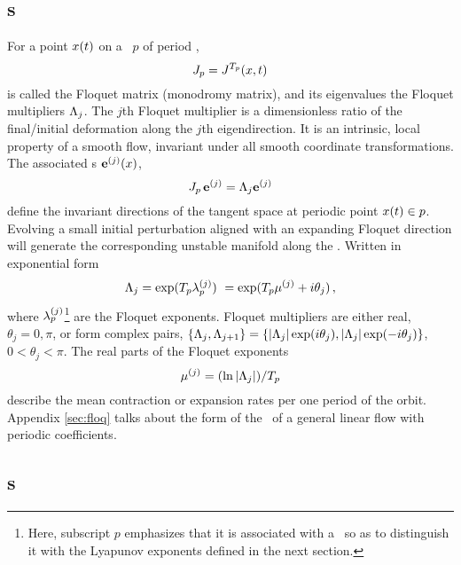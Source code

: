 \subsection{\Fv s}
\label{sect:LinStab}

For a point
$\ssp(\zeit)$ on a \po\ $p$ of period ,
\begin{equation}
  \label{eq:fm}
  \jMps_p=\jMps^{\period{p}}(\ssp, \zeit)
\end{equation}
is called the Floquet matrix
(monodromy matrix), and its
eigenvalues the Floquet multipliers $\ExpaEig_{j}$.
The $j$th Floquet multiplier is a dimensionless ratio of
the final/initial
deformation along the $j$th eigendirection. It is an intrinsic, local
property of a smooth flow, invariant under all smooth coordinate
transformations. The associated
\Fv s $\jEigvec[j](\ssp)$,
\begin{equation}
  \label{eq:fv}
  \jMps_p\,\jEigvec[j]=\ExpaEig_{j}\jEigvec[j]
\end{equation} define the invariant
directions of the tangent space at periodic point
$\ssp(\zeit)\in p$. Evolving a small initial perturbation aligned with
an expanding Floquet direction will generate the corresponding
unstable manifold along
the \po. Written in exponential form
\[
  \ExpaEig_{j} = \exp(\period{p}\Lyap^{(j)}_p)\
  = \exp(\period{p}\eigRe[j] + i\theta_j)
  \,,
\]
where $\Lyap^{(j)}_p$\footnote{Here, subscript $p$ emphasizes
  that it is
  associated with a \po\ so as to distinguish it
  with the Lyapunov exponents defined in
  the next section.} are the
Floquet exponents.
Floquet multipliers are either real,
$\theta_j = 0, \pi$, or form
complex pairs, $\{\ExpaEig_{j},\ExpaEig_{j+1}\} =
\{|\ExpaEig_{j}|\exp(i\theta_j),|\ExpaEig_{j}|\exp(-i\theta_j)\}$, $0
<\theta_j <\pi$. The real parts of the
Floquet exponents
\begin{equation}
  \label{eq:fe}
  \eigRe[j] = (\ln|\ExpaEig_{j}|)/\period{p}
\end{equation}
describe the mean contraction or
expansion rates per one period of the orbit.
Appendix \ref{sec:floq} talks about the form of the \JacobianM\ of
a general linear flow with periodic coefficients.

\subsection{\CLv s}


